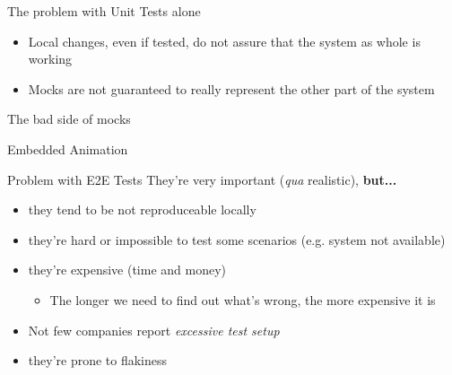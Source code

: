 \begin{frame}{The problem with Unit Tests alone}
  \begin{itemize}
    \item Local changes, even if tested, do not assure that the system as whole is working
    \item Mocks are not guaranteed to really represent the other part of the system
  \end{itemize}
\end{frame}

\begin{frame}{The bad side of mocks}
  \begin{center}
  \end{center}
\end{frame}

\begin{frame}{Embedded Animation}
  \begin{center}
  \end{center}
\end{frame}

\begin{frame}{Problem with E2E Tests}
  They're very important (\textit{qua} realistic), \textbf{but...}
  \begin{itemize}
    \item they tend to be not reproduceable locally
    \item they're hard or impossible to test some scenarios (e.g. system not available)
    \item they're expensive (time and money)
    \begin{itemize}
      \item The longer we need to find out what's wrong, the more expensive it is
    \end{itemize}
    \item Not few companies report \textit{excessive test setup}
    \item they're prone to flakiness
  \end{itemize}
\end{frame}

